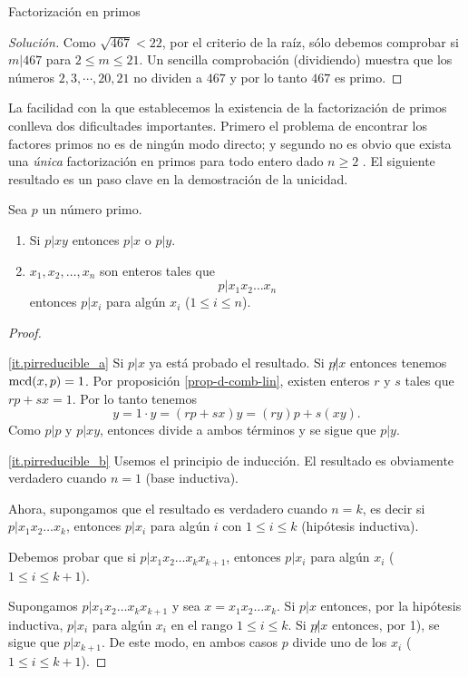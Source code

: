 \begin{section}{Factorización en primos}
\begin{proof}[Solución]
    Como $\sqrt{467} < 22$, por el criterio de la raíz, sólo debemos comprobar si $m|467$ para $2\le m \le 21$. Un sencilla comprobación (dividiendo) muestra que los números $2,3,\cdots,20,21$ no  dividen a $467$ y por  lo tanto $467$ es primo.
\end{proof}



La facilidad con la que establecemos la existencia de la factorización de primos conlleva dos dificultades importantes. Primero el problema de encontrar los factores primos no es de ningún modo directo; y segundo no es obvio que exista una \textit{única} factorización en primos para todo entero dado $n\ge 2$ . El siguiente resultado es un paso clave en la demostración de la unicidad.

\begin{teorema}\label{t1.8} Sea $p$  un número  primo.

\begin{enumerate}[label=\textit{\alph*)}]
\item\label{it.pirreducible_a} Si $p|xy$ entonces $p|x$ o $p|y$.
\item\label{it.pirreducible_b} $x_1,x_2,\ldots,x_n$ son enteros tales que
$$
p|x_1x_2\ldots x_n
$$
entonces $p|x_i$ para algún $x_i$ ($1\le i \le n$).
\end{enumerate}
\end{teorema}
\begin{proof}
\

\ref{it.pirreducible_a}  Si $p|x$ ya está probado el resultado. Si $p{{\not|}}x$ entonces tenemos $\operatorname{mcd}(x,p)=1$. Por proposición \ref{prop-d-comb-lin}, existen enteros $r$ y $s$ tales que $rp+sx=1$. Por lo tanto tenemos 
$$
y = 1 \cdot y = (rp+sx)y =(ry)p+s(xy).
$$
Como $p|p$ y $p|xy$, entonces divide a ambos términos y se sigue que $p|y$. 

\ref{it.pirreducible_b} Usemos el principio de inducción. El resultado es obviamente verdadero cuando $n=1$ (base inductiva). 

Ahora, supongamos que el resultado es verdadero cuando $n=k$, es decir si $p|x_1x_2\ldots x_k$, entonces 
$p|x_i$ para algún $i$ con $1\le i \le k$ (hipótesis inductiva).

Debemos probar que si $p|x_1x_2\ldots x_{k}x_{k+1}$, entonces  $p|x_i$ para algún $x_i$ ($1\le i \le k+1$).

Supongamos $p|x_1x_2\ldots x_{k}x_{k+1}$ y sea $x=x_1x_2\ldots x_k$. Si $p|x$ entonces, por la hipótesis inductiva, $p|x_i$ para algún $x_i$ en el rango $1\le i \le k$. Si $p{{\not|}}x$ entonces, por 1), se sigue que $p|x_{k+1}$. De este modo, en ambos casos $p$ divide uno de los $x_i$ ($1\le i\le k+1$). 
\end{proof}


\end{section}
